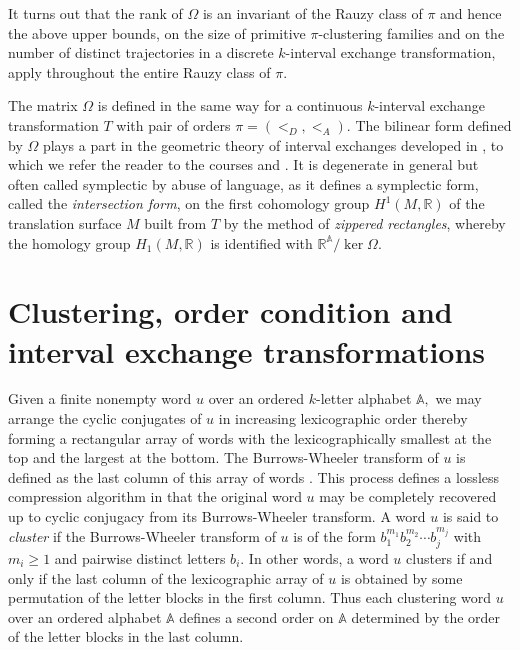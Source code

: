\documentclass[12pt,a4paper]{amsart}
\newcommand{\reals}{{\mathbb R}}
\newcommand{\A}{{\mathbb A}}
\begin{document}
It turns out that the rank of $\Omega$ is an invariant of the Rauzy class of $\pi$ and hence the above upper bounds, on the size of primitive $\pi$-clustering families and  on the number of distinct trajectories in a  discrete $k$-interval exchange transformation, apply throughout the entire Rauzy class of $\pi.$

The matrix $\Omega$ is defined in the same way  for a continuous $k$-interval exchange transformation $T$ with   pair of orders $\pi=(<_D,<_A).$ The bilinear form defined by $\Omega$
plays a part in the geometric theory of interval exchanges developed in \cite{vee}, to which we refer the reader to the courses  \cite{via} and \cite{yoc}. It is degenerate in general but often called symplectic by abuse of language, as it defines a symplectic form, called the {\it intersection form}, on the first cohomology group $H^1(M,\reals)$ of the  translation surface $M$  built from $T$ by the method of {\it zippered rectangles}, whereby the homology group $H_1(M,\reals)$  is identified with  $\reals^\A/\ker\Omega.$



\section{Clustering, order condition and interval exchange transformations}

Given a finite nonempty word $u$ over an ordered  $k$-letter alphabet $\A,$  we may arrange the cyclic conjugates of $u$  in increasing lexicographic order thereby forming a rectangular array of words with the lexicographically  smallest at the  top and the  largest at the bottom. The Burrows-Wheeler transform of $u$ is defined as the last column of this array of words \cite{bw}. This process defines a  lossless compression algorithm in that the original word $u$ may be completely recovered up to cyclic conjugacy from its Burrows-Wheeler transform.    A word $u$ is said to {\it cluster} if the Burrows-Wheeler transform of $u$  is of the form $b_1^{m_1}b_2^{m_2}\cdots b_j^{m_j}$ with $m_i\geq 1$ and  pairwise distinct letters $b_i.$     In other words, a word $u$ clusters if and only if the last column of the lexicographic array of $u$ is obtained by some permutation of the letter blocks in the first column. Thus each clustering word $u$ over an ordered alphabet $\A$ defines a second order  on  $\A$ determined by the order of the letter blocks in the last column. 
\end{document}
